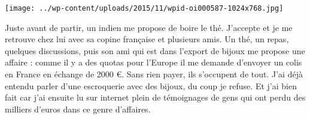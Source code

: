  \newline
\centerline{\texttt{[image: ../wp-content/uploads/2015/11/wpid-oi000587-1024x768.jpg]} } 
 \newline
 Juste avant de partir, un indien me propose de boire le thé. J'accepte et je me retrouve chez lui avec sa copine française et plusieurs amis. Un thé, un repas, quelques discussions, puis son ami qui est dans l'export de bijoux me propose une affaire : comme il y a des quotas pour l'Europe il me demande d'envoyer un colis en France en échange de 2000 €. Sans rien payer, ils s'occupent de tout. \newline
 J'ai déjà entendu parler d'une escroquerie avec des bijoux, du coup je refuse. \newline
 Et j'ai bien fait car j'ai ensuite lu sur internet plein de témoignages de gens qui ont perdu des milliers d'euros dans ce genre d'affaires. \newline

\newpage
 
